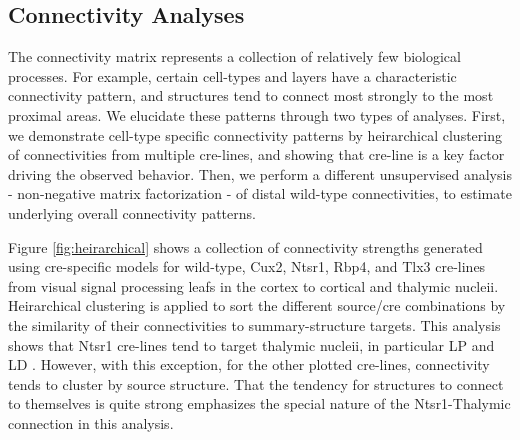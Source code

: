 \newpage

\begin{figure}[H]
    \newline
    \label{fig:data}
\end{figure}
\newpage


\subsection{Connectivity Analyses}


The connectivity matrix represents a collection of relatively few biological processes.
For example, certain cell-types and layers have a characteristic connectivity pattern, and structures tend to connect most strongly to the most proximal areas.
We elucidate these patterns through two types of analyses. 
First, we demonstrate cell-type specific connectivity patterns by heirarchical clustering of connectivities from multiple cre-lines, and showing that cre-line is a key factor driving the observed behavior. 
Then, we perform a different unsupervised analysis - non-negative matrix factorization - of distal wild-type connectivities, to estimate underlying overall connectivity patterns.

Figure \ref{fig:heirarchical} shows a collection of connectivity strengths generated using cre-specific models for wild-type, Cux2, Ntsr1, Rbp4, and Tlx3 cre-lines from visual signal processing leafs in the cortex to cortical and thalymic nucleii.
Heirarchical clustering is applied to sort the different source/cre combinations by the similarity of their connectivities to summary-structure targets.
This analysis shows that Ntsr1 cre-lines tend to target thalymic nucleii, in particular LP and LD \citet{Jeong2016-dc}.
However, with this exception, for the other plotted cre-lines, connectivity tends to cluster by source structure.
That the tendency for structures to connect to themselves is quite strong emphasizes the special nature of the Ntsr1-Thalymic connection in this analysis.

